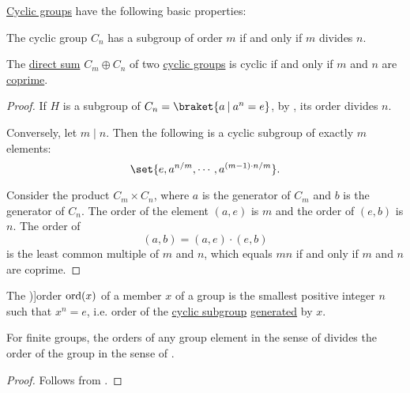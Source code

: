 \begin{proposition}\label{thm:def:cyclic_group}
  \hyperref[def:cyclic_group]{Cyclic groups} have the following basic properties:
  \begin{thmenum}
     The cyclic group \( C_n \) has a subgroup of order \( m \) if and only if \( m \) divides \( n \).

     The \hyperref[def:semimodule_direct_sum]{direct sum} \( C_m \oplus C_n \) of two \hyperref[def:cyclic_group]{cyclic groups} is cyclic if and only if \( m \) and \( n \) are \hyperref[def:coprime_elements]{coprime}.
  \end{thmenum}
\end{proposition}
\begin{proof}
  \SufficiencySubProof* If \( H \) is a subgroup of \( C_n = \braket{ a \given a^n = e } \), by , its order divides \( n \).

  \NecessitySubProof* Conversely, let \( m \mid n \). Then the following is a cyclic subgroup of exactly \( m \) elements:
  \begin{equation*}
    \set{ e, a^{n / m}, \cdots, a^{(m - 1) \cdot n / m} }.
  \end{equation*}

   Consider the product \( C_m \times C_n \), where \( a \) is the generator of \( C_m \) and \( b \) is the generator of \( C_n \). The order of the element \( (a, e) \) is \( m \) and the order of \( (e, b) \) is \( n \). The order of
  \begin{equation*}
    (a, b) = (a, e) \cdot (e, b)
  \end{equation*}
  is the least common multiple of \( m \) and \( n \), which equals \( mn \) if and only if \( m \) and \( n \) are coprime.
\end{proof}

\begin{definition}\label{def:group_element_order}
  The \term[ru=степень (\cite[sec. 2.10]{Тыртышников2007ЛинАлгебра})]{order} \( \operatorname{ord}(x) \) of a member \( x \) of a group is the smallest positive integer \( n \) such that \( x^n = e \), i.e. order of the \hyperref[def:cyclic_group]{cyclic subgroup} \hyperref[def:group/submodel]{generated} by \( x \).
\end{definition}

\begin{proposition}\label{thm:def:group_element_order}
  For finite groups, the orders of any group element in the sense of  divides the order of the group in the sense of .
\end{proposition}
\begin{proof}
  Follows from .
\end{proof}
